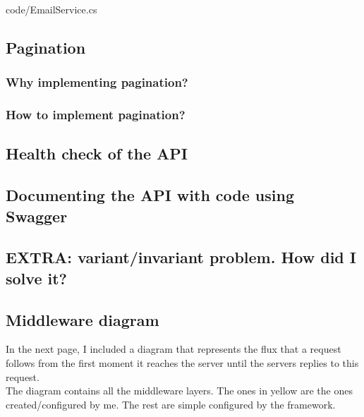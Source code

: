     
    {code/EmailService.cs}

    \subsection{Pagination}
        \subsubsection{Why implementing pagination?}
        \subsubsection{How to implement pagination?}
    \subsection{Health check of the API}
    \subsection{Documenting the API with code using Swagger}
    \subsection{EXTRA: variant/invariant problem. How did I solve it?}
    \subsection{Middleware diagram}
    In the next page, I included a diagram that represents the flux that a request follows from the first moment it reaches the server until the servers replies to this request. \\

    The diagram contains all the middleware layers. The ones in yellow are the ones created/configured by me. The rest are simple configured by the framework. \\

